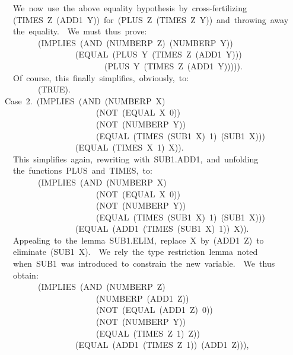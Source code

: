 \documentclass[11pt]{book}
\newenvironment{pubasis}{\begin{flushleft}\ttfamily\small}{\normalsize\rmfamily\end{flushleft}}
\begin{document}
\begin{pubasis}
~~~~We~now~use~the~above~equality~hypothesis~by~cross-fertilizing\\
~~~~(TIMES~Z~(ADD1~Y))~for~(PLUS~Z~(TIMES~Z~Y))~and~throwing~away\\
~~~~the~equality.~~We~must~thus~prove:\\

~~~~~~~~~~(IMPLIES~(AND~(NUMBERP~Z)~(NUMBERP~Y))\\
~~~~~~~~~~~~~~~~~~~(EQUAL~(PLUS~Y~(TIMES~Z~(ADD1~Y)))\\
~~~~~~~~~~~~~~~~~~~~~~~~~~(PLUS~Y~(TIMES~Z~(ADD1~Y))))).\\

~~~~Of~course,~this~finally~simplifies,~obviously,~to:\\

~~~~~~~~~~(TRUE).\\

~~Case~2.~(IMPLIES~(AND~(NUMBERP~X)\\
~~~~~~~~~~~~~~~~~~~~~~~~(NOT~(EQUAL~X~0))\\
~~~~~~~~~~~~~~~~~~~~~~~~(NOT~(NUMBERP~Y))\\
~~~~~~~~~~~~~~~~~~~~~~~~(EQUAL~(TIMES~(SUB1~X)~1)~(SUB1~X)))\\
~~~~~~~~~~~~~~~~~~~(EQUAL~(TIMES~X~1)~X)).\\

~~~~This~simplifies~again,~rewriting~with~SUB1.ADD1,~and~unfolding\\
~~~~the~functions~PLUS~and~TIMES,~to:\\

~~~~~~~~~~(IMPLIES~(AND~(NUMBERP~X)\\
~~~~~~~~~~~~~~~~~~~~~~~~(NOT~(EQUAL~X~0))\\
~~~~~~~~~~~~~~~~~~~~~~~~(NOT~(NUMBERP~Y))\\
~~~~~~~~~~~~~~~~~~~~~~~~(EQUAL~(TIMES~(SUB1~X)~1)~(SUB1~X)))\\
~~~~~~~~~~~~~~~~~~~(EQUAL~(ADD1~(TIMES~(SUB1~X)~1))~X)).\\

~~~~Appealing~to~the~lemma~SUB1.ELIM,~replace~X~by~(ADD1~Z)~to\\
~~~~eliminate~(SUB1~X).~~We~rely~the~type~restriction~lemma~noted\\
~~~~when~SUB1~was~introduced~to~constrain~the~new~variable.~~We~thus\\
~~~~obtain:\\

~~~~~~~~~~(IMPLIES~(AND~(NUMBERP~Z)\\
~~~~~~~~~~~~~~~~~~~~~~~~(NUMBERP~(ADD1~Z))\\
~~~~~~~~~~~~~~~~~~~~~~~~(NOT~(EQUAL~(ADD1~Z)~0))\\
~~~~~~~~~~~~~~~~~~~~~~~~(NOT~(NUMBERP~Y))\\
~~~~~~~~~~~~~~~~~~~~~~~~(EQUAL~(TIMES~Z~1)~Z))\\
~~~~~~~~~~~~~~~~~~~(EQUAL~(ADD1~(TIMES~Z~1))~(ADD1~Z))),\\


\end{pubasis}
\end{document}
